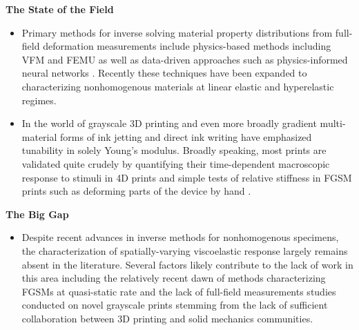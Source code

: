 \textbf{The State of the Field}
\begin{itemize}
    \item Primary methods for inverse solving material property distributions from full-field deformation measurements include physics-based methods including VFM \cite{grediac1989principe} and FEMU \cite{mottershead1993model} as well as data-driven approaches such as physics-informed neural networks \cite{GHAFFARIMOTLAGH2025117650}. Recently these techniques have been expanded to characterizing nonhomogenous materials at linear elastic \cite{Mei2021} and hyperelastic \cite{shojaee5294317automated} regimes. 
    \item In the world of grayscale 3D printing \cite{Kuang2019,Peterson2016} and even more broadly gradient multi-material forms of ink jetting \cite{Müller2014} and direct ink writing \cite{Young2024} have emphasized tunability in solely Young's modulus. Broadly speaking, most prints are validated quite crudely by quantifying their time-dependent macroscopic response to stimuli in 4D prints \cite{ANDREU2021102024} and simple tests of relative stiffness in FGSM prints such as deforming parts of the device by hand \cite{Yue2023}. 
\end{itemize}

\textbf{The Big Gap}
\begin{itemize}
    \item Despite recent advances in inverse methods for nonhomogenous specimens, the characterization of spatially-varying viscoelastic response largely remains absent in the literature. Several factors likely contribute to the lack of work in this area including the relatively recent dawn of methods characterizing FGSMs at quasi-static rate and the lack of full-field measurements studies conducted on novel grayscale prints stemming from the lack of sufficient collaboration between 3D printing and solid mechanics communities. 
\end{itemize}


